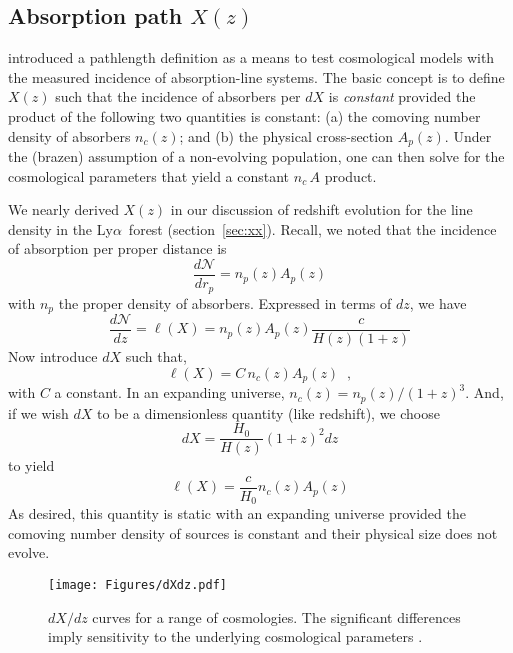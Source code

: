 \documentclass[graybox]{svmult}
\def\lya{Ly$\alpha$}
\begin{document}
\subsection{Absorption path $X(z)$}

\cite{bp69} introduced a pathlength definition as a means to test 
cosmological models with the measured incidence of 
absorption-line systems.
The basic concept is to
define $X(z)$ such that the incidence of absorbers per $dX$
is {\it constant} provided the product of the following two 
quantities is constant:
(a) the comoving number density of absorbers $n_c(z)$;
and
(b) the physical cross-section $A_p(z)$.
Under the (brazen) assumption of a non-evolving population, one can
then solve for the cosmological parameters that yield a
constant $n_c \, A$ product.

We nearly derived $X(z)$ in our discussion of redshift evolution
for the line density in the \lya\ forest (section~\ref{sec:xx}).
Recall, we noted that the 
incidence of absorption per proper distance is
\begin{equation}
\frac{d \mathcal{N}}{dr_p} = n_p(z) A_p(z)
\end{equation}
with $n_p$ the proper density of absorbers.
Expressed in terms of $dz$, we have
\begin{equation}
\frac{d \mathcal{N}}{dz} = \ell(X) = n_p(z) A_p(z) \frac{c}{H(z) (1+z)}
\end{equation}
Now introduce $dX$ such that,
\begin{equation}
\ell(X) = C \, n_c(z) A_p(z) \;\; ,
\end{equation}
with $C$ a constant.
In an expanding universe, $n_c(z) = n_p(z) / (1+z)^3$.
And, if we wish $dX$ to be a dimensionless quantity (like redshift),
we choose
\begin{equation}
dX = \frac{H_0}{H(z)} (1+z)^2 dz
\end{equation}
to yield
\begin{equation}
\ell(X) = \frac{c}{H_0} n_c(z) A_p(z)
\end{equation}
As desired, this quantity is static with an expanding universe
provided the comoving number density of sources is constant and
their physical size does not evolve.

%
\begin{figure}[b]
\sidecaption
\texttt{[image: Figures/dXdz.pdf]}
%
%
\caption{$dX/dz$ curves for a range of cosmologies.
The significant differences imply sensitivity
to the underlying cosmological parameters \cite[]{bp69}.
}
\label{fig:dXdz}       %
\end{figure}
\end{document}
